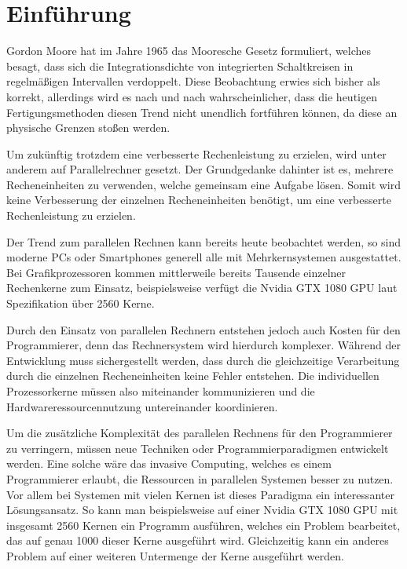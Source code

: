 \chapter{Einführung}\label{sec:intro}

Gordon Moore hat im Jahre 1965 das Mooresche Gesetz formuliert, welches besagt, dass sich die Integrationsdichte
von integrierten Schaltkreisen in regelmäßigen Intervallen verdoppelt\cite{mooresLawPastPresentFuture}.
Diese Beobachtung erwies sich bisher als korrekt, allerdings wird es nach und nach wahrscheinlicher,
dass die heutigen Fertigungsmethoden diesen Trend nicht unendlich fortführen können, da diese an
physische Grenzen stoßen werden.\cite{endOfMooresLaw}

Um zukünftig trotzdem eine verbesserte Rechenleistung zu erzielen, wird unter anderem auf Parallelrechner gesetzt.
Der Grundgedanke dahinter ist es, mehrere Recheneinheiten zu verwenden, welche gemeinsam eine Aufgabe
lösen. Somit wird keine Verbesserung der einzelnen Recheneinheiten benötigt, um eine verbesserte Rechenleistung
zu erzielen.

Der Trend zum parallelen Rechnen kann bereits heute beobachtet werden,
so sind moderne PCs oder Smartphones generell alle mit Mehrkernsystemen ausgestattet.
Bei Grafikprozessoren kommen mittlerweile bereits Tausende einzelner Rechenkerne zum Einsatz,
beispielsweise verfügt die Nvidia GTX 1080 GPU laut Spezifikation \cite{nvidia1080specs} über 2560 Kerne.

Durch den Einsatz von parallelen Rechnern entstehen jedoch auch Kosten für den Programmierer,
denn das Rechnersystem wird hierdurch komplexer.
Während der Entwicklung muss sichergestellt werden, dass durch die gleichzeitige Verarbeitung durch die einzelnen
Recheneinheiten keine Fehler entstehen. Die individuellen Prozessorkerne müssen also miteinander
kommunizieren und die Hardwareressourcennutzung untereinander koordinieren.

Um die zusätzliche Komplexität des parallelen Rechnens für den Programmierer zu verringern,
müssen neue Techniken oder Programmierparadigmen entwickelt werden.
Eine solche wäre das invasive Computing, welches es einem Programmierer erlaubt,
die Ressourcen in parallelen Systemen besser zu nutzen.
Vor allem bei Systemen mit vielen Kernen ist dieses Paradigma ein interessanter Lösungsansatz.
So kann man beispielsweise auf einer Nvidia GTX 1080 GPU mit insgesamt 2560 Kernen ein Programm
ausführen, welches ein Problem bearbeitet, das auf genau 1000 dieser Kerne ausgeführt wird.
Gleichzeitig kann ein anderes Problem auf einer weiteren Untermenge der Kerne ausgeführt werden.

